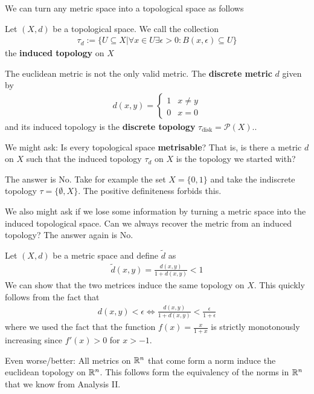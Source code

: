 We can turn any metric space into a topological space as follows
\begin{dfn}[]
  Let $(X,d)$ be a topological space. We call the collection
  \begin{align*}
    \tau_d := \{U \subseteq X \big\vert \forall x \in U \exists \epsilon > 0: B(x,\epsilon) \subseteq U\}
  \end{align*}
  the \textbf{induced topology} on $X$
\end{dfn}

\begin{ex}[]
  The euclidean metric is not the only valid metric. The \textbf{discrete metric} $d$ given by
  \begin{align*}
    d(x,y) = \left\{\begin{array}{ll}
      1 & x \neq y \\
      0 & x = 0
    \end{array} \right.
  \end{align*}
  and its induced topology is the \textbf{discrete topology} $\tau_{\text{disk}} = \mathcal{P}(X)$..
\end{ex}
We might ask: Is every topological space \textbf{metrisable}? That is, is there a metric $d$ on $X$ such that the induced topology $\tau_d$ on $X$ is the topology we started with?

The answer is No. Take for example the set $X = \{0,1\}$ and take the indiscrete topology $\tau = \{\emptyset, X\}$. The positive definiteness forbids this.

We also might ask if we lose some information by turning a metric space into the induced topological space. 
Can we always recover the metric from an induced topology? The answer again is No.
\begin{ex}[]
  Let $(X,d)$ be a metric space and define $\tilde{d}$ as
  \begin{align*}
    \tilde{d}(x,y) = \frac{d(x,y)}{1 + d(x,y)} < 1
  \end{align*}
  We can show that the two metrices induce the same topology on $X$. This quickly follows from the fact that
  \begin{align*}
    d(x,y) <\epsilon \iff \frac{d(x,y)}{1 + d(x,y)} < \frac{\epsilon}{1 + \epsilon}
  \end{align*}
  where we used the fact that the function $f(x) = \frac{x}{1 + x}$ is strictly monotonously increasing since $f'(x) > 0$ for $x > -1$.
\end{ex}

Even worse/better: All metrics on $\mathbb{R}^n$ that come form a norm induce the euclidean topology on $\mathbb{R}^n$. This follows form the equivalency of the norms in $\mathbb{R}^{n}$ that we know from Analysis II.

